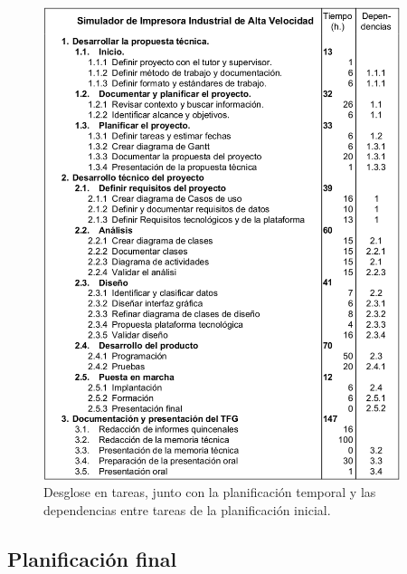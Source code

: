 \documentclass[pdftex,11pt,a4paper]{book}
\begin{document}
\begin{figure}[H]
\includegraphics[width=0.93\textwidth]{img/lista_tareas.png}
\caption{\label{tareas_inicial}Desglose en tareas, junto con la planificación temporal y las dependencias entre tareas de la planificación inicial.}
\end{figure}

\subsection{Planificación final}
\end{document}
